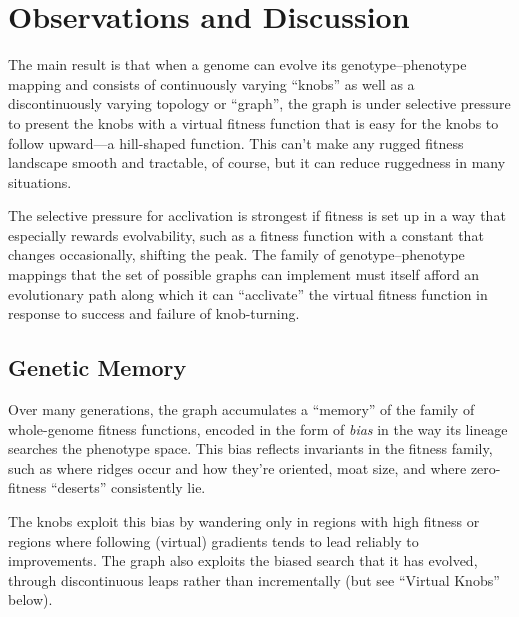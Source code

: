 \documentclass[letterpaper]{article}
\begin{document}
\section{Observations and Discussion}

The main result is that when a genome can evolve its genotype--phenotype
mapping and consists of continuously varying ``knobs'' as well as a
discontinuously varying topology or ``graph'', the graph is under selective
pressure to present the knobs with a virtual fitness function that is easy for
the knobs to follow upward---a hill-shaped function. This can't make any
rugged fitness landscape smooth and tractable, of course, but it can reduce
ruggedness in many situations.

The selective pressure for acclivation is strongest if fitness is set up in a
way that especially rewards evolvability, such as a fitness function with a
constant that changes occasionally, shifting the peak. The family of
genotype--phenotype mappings that the set of possible graphs can implement must
itself afford an evolutionary path along which it can ``acclivate'' the virtual
fitness function in response to success and failure of knob-turning.


\subsection{Genetic Memory}

Over many generations, the graph accumulates a ``memory'' of the family of
whole-genome fitness functions, encoded in the form of \textit{bias} in the way
its lineage searches the phenotype space. This bias reflects invariants in the
fitness family, such as where ridges occur and how they're oriented, moat size,
and where zero-fitness ``deserts'' consistently lie.

The knobs exploit this bias by wandering only in regions with high fitness or
regions where following (virtual) gradients tends to lead reliably to
improvements. The graph also exploits the biased search that it has evolved,
through discontinuous leaps rather than incrementally (but see ``Virtual
Knobs'' below).
\end{document}
